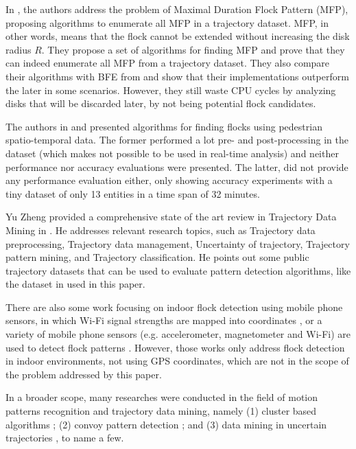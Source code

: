 In \citep{enumeration}, the authors address the problem of Maximal Duration Flock Pattern (MFP), proposing algorithms
to enumerate all MFP in a trajectory dataset. MFP, in other words, means that the flock cannot be extended without
increasing the disk radius $R$. They propose a set of algorithms for finding MFP and prove that they can indeed
enumerate all MFP from a trajectory dataset. They also compare their algorithms with BFE from \citep{vieira} and show
that their implementations outperform the later in some scenarios. However, they still waste CPU cycles by analyzing
disks that will be discarded later, by not being potential flock candidates.

The authors in \citep{flockpedestrian} and \citep{pedestriancanyons} presented algorithms for finding flocks using
pedestrian spatio-temporal data. The former performed a lot pre- and post-processing in the dataset (which makes not
possible to be used in real-time analysis) and neither performance nor accuracy evaluations were presented. The latter,
did not provide any performance evaluation either, only showing accuracy experiments with a tiny dataset of only 13
entities in a time span of 32 minutes.

Yu Zheng provided a comprehensive state of the art review in Trajectory Data Mining in \citep{survey}. He addresses
relevant research topics, such as Trajectory data preprocessing, Trajectory data management, Uncertainty of trajectory,
Trajectory pattern mining, and Trajectory classification. He points out some public trajectory datasets that can be used
to evaluate pattern detection algorithms, like the dataset in \citep{tdrive} used in this paper.

There are also some work focusing on indoor flock detection using mobile phone sensors, in which Wi-Fi signal strengths
are mapped into coordinates \citep{mobile1}, or a variety of mobile phone sensors (e.g. accelerometer, magnetometer
and Wi-Fi) are used to detect flock patterns \citep{mobile2}. However, those works only address flock detection in
indoor environments, not using GPS coordinates, which are not in the scope of the problem addressed by this paper.

In a broader scope, many researches were conducted in the field of motion patterns recognition and trajectory data
mining, namely (1) cluster based algorithms
\citep{clusters1}\citep{movingclusters}\citep{clusters2}\citep{clusters3}; (2) convoy pattern detection
\citep{convoy}\citep{flockpedestrian}\citep{convoy2}\citep{convoy3}; and (3) data mining in uncertain
trajectories \citep{uncertain1}\citep{uncertain2}\citep{uncertain3}\citep{uncertain4}, to name a few.

